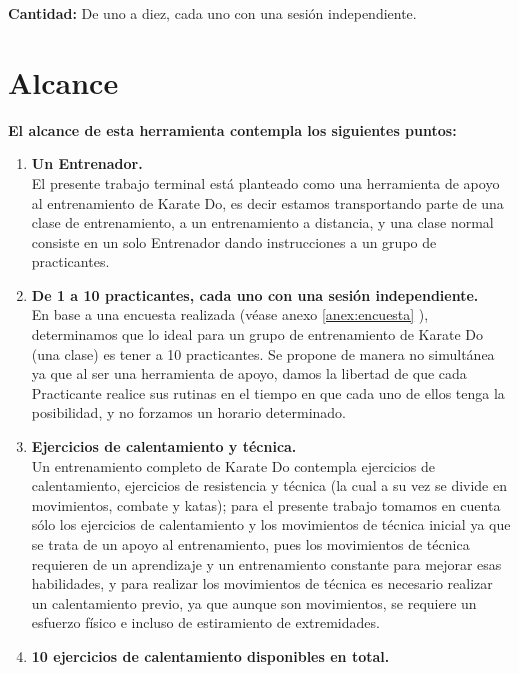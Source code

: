 \textbf{\textcolor[rgb]{0, 0, 0.545098}{Cantidad:}} De uno a diez, cada uno con una sesión independiente.
\section{Alcance}
\label{sec:Alcance}
\textbf{El alcance de esta herramienta contempla los siguientes puntos:}\\
\begin{enumerate}
	\item \textbf{\textcolor[rgb]{0, 0, 0.545098}{Un Entrenador.}}\\
	El presente trabajo terminal está planteado como una herramienta de apoyo al entrenamiento de Karate Do, es decir estamos transportando parte de una clase de entrenamiento, a un entrenamiento a distancia, y una clase normal consiste en un solo Entrenador dando instrucciones a un grupo de practicantes.\\
	\item \textbf{\textcolor[rgb]{0, 0, 0.545098}{De 1 a 10 practicantes, cada uno con una sesión independiente.}}\\
	En base a una encuesta realizada (véase anexo \ref{anex:encuesta} ), determinamos que lo ideal para un grupo de entrenamiento de Karate Do (una clase) es tener a 10 practicantes. Se propone de manera no simultánea ya que al ser una herramienta de apoyo, damos la libertad de que cada Practicante realice sus rutinas en el tiempo en que cada uno de ellos tenga la posibilidad, y no forzamos un horario determinado.\\
	\item \textbf{\textcolor[rgb]{0, 0, 0.545098}{Ejercicios de calentamiento y técnica.}}\\
	Un entrenamiento completo de Karate Do contempla ejercicios de calentamiento, ejercicios de resistencia y técnica (la cual a su vez se divide en movimientos, combate y katas); para el presente trabajo tomamos en cuenta sólo los ejercicios de calentamiento y los movimientos de técnica inicial ya que se trata de un apoyo al entrenamiento, pues los movimientos de técnica  requieren de un aprendizaje y un entrenamiento constante para mejorar esas habilidades, y para realizar los movimientos de técnica es necesario realizar un calentamiento previo, ya que aunque son movimientos, se requiere un esfuerzo físico e incluso de estiramiento de extremidades.\\
	\item \textbf{\textcolor[rgb]{0, 0, 0.545098}{10 ejercicios de calentamiento disponibles en total.}}\\

\end{enumerate}
